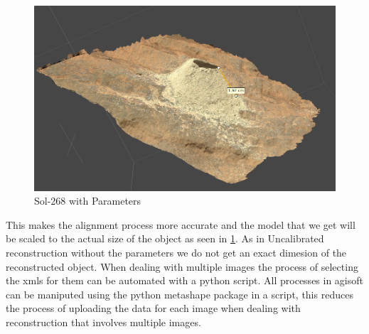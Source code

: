 \begin{figure}[H]
	\centering
	\includegraphics[scale=0.3]{img/drill.png}
	\caption{Sol-268 with Parameters}
	\label{fig:drillHole}
\end{figure}
This makes the alignment process more accurate and the model that we get will be scaled to the actual size of the object as seen in \ref{fig:drillHole}. As in Uncalibrated reconstruction without the parameters we do not get an exact dimesion of the reconstructed object. When dealing with multiple images the process of selecting the xmls for them can be automated with a python script. All processes in agisoft can be maniputed using the python metashape package in a script, this reduces the process of uploading the data for each image when dealing with reconstruction that involves multiple images.

